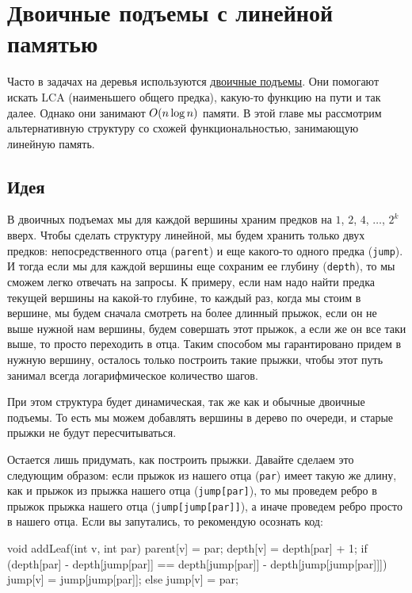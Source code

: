 \chapter{Двоичные подъемы с линейной памятью}\label{linear-binups}

Часто в задачах на деревья используются \href{https://e-maxx.ru/algo/lca_simpler}{двоичные подъемы}. Они помогают искать LCA (наименьшего общего предка), какую-то функцию на пути и так далее. Однако они занимают $O(n \log n)$ памяти. В этой главе мы рассмотрим альтернативную структуру со схожей функциональностью, занимающую линейную память.

\section{Идея}

В двоичных подъемах мы для каждой вершины храним предков на $1$, $2$, $4$, $\ldots$, $2^k$ вверх. Чтобы сделать структуру линейной, мы будем хранить только двух предков: непосредственного отца (\verb+parent+) и еще какого-то одного предка (\verb+jump+). И тогда если мы для каждой вершины еще сохраним ее глубину (\verb+depth+), то мы сможем легко отвечать на запросы. К примеру, если нам надо найти предка текущей вершины на какой-то глубине, то каждый раз, когда мы стоим в вершине, мы будем сначала смотреть на более длинный прыжок, если он не выше нужной нам вершины, будем совершать этот прыжок, а если же он все таки выше, то просто переходить в отца. Таким способом мы гарантировано придем в нужную вершину, осталось только построить такие прыжки, чтобы этот путь занимал всегда логарифмическое количество шагов.

При этом структура будет динамическая, так же как и обычные двоичные подъемы. То есть мы можем добавлять вершины в дерево по очереди, и старые прыжки не будут пересчитываться.

Остается лишь придумать, как построить прыжки. Давайте сделаем это следующим образом: если прыжок из нашего отца (\verb+par+) имеет такую же длину, как и прыжок из прыжка нашего отца (\verb+jump[par]+), то мы проведем ребро в прыжок прыжка нашего отца (\verb+jump[jump[par]]+), а иначе проведем ребро просто в нашего отца. Если вы запутались, то рекомендую осознать код:

\begin{code}
void addLeaf(int v, int par) {
    parent[v] = par;
    depth[v] = depth[par] + 1;
    if (depth[par] - depth[jump[par]] == depth[jump[par]] - depth[jump[jump[par]]]) {
        jump[v] = jump[jump[par]];
    } else {
        jump[v] = par;
    }
}
\end{code}

